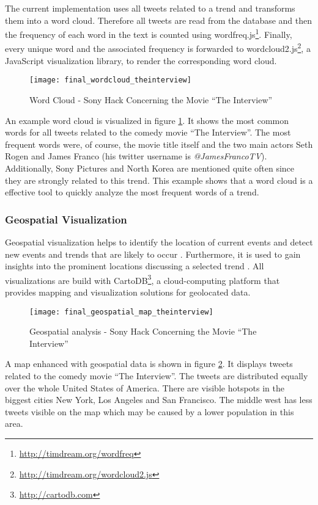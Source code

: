The current implementation uses all tweets related to a trend and transforms them into a word cloud. Therefore all tweets are read from the database and then the frequency of each word in the text is counted using wordfreq.js\footnote{\url{http://timdream.org/wordfreq} \accessednote}. Finally, every unique word and the associated frequency is forwarded to wordcloud2.js\footnote{\url{http://timdream.org/wordcloud2.js} \accessednote}, a JavaScript visualization library, to render the corresponding word cloud.

\begin{figure}[H]
  \centering
        \texttt{[image: final\_wordcloud\_theinterview]}
  \caption[Word Cloud - Sony Hack Concerning the Movie \enquote{The Interview}]{Word Cloud - Sony Hack Concerning the Movie \enquote{The Interview}}
  \label{fig:word-cloud-interview}
  \vspace{-1.3em}
\end{figure}

An example word cloud is visualized in figure \ref{fig:word-cloud-interview}. It shows the most common words for all tweets related to the comedy movie \enquote{The Interview}. The most frequent words were, of course, the movie title itself and the two main actors Seth Rogen and James Franco (his twitter username is \textit{@JamesFrancoTV}). Additionally, Sony Pictures and North Korea are mentioned quite often since they are strongly related to this trend. This example shows that a word cloud is a effective tool to quickly analyze the most frequent words of a trend.

\subsubsection{Geospatial Visualization}
\label{subsubsection:vis-geospatial}
Geospatial visualization helps to identify the location of current events and detect new events and trends that are likely to occur \cite{TwitterDataAnalytics2013}. Furthermore, it is used to gain insights into the prominent locations discussing a selected trend \cite[64-66]{TwitterDataAnalytics2013}. All visualizations are build with CartoDB\footnote{\url{http://cartodb.com} \accessednote}, a cloud-computing platform that provides mapping and visualization solutions for geolocated data.

\begin{figure}[H]
  \centering
        \texttt{[image: final\_geospatial\_map\_theinterview]}
  \caption[Geospatial analysis - Sony Hack Concerning the Movie \enquote{The Interview}]{Geospatial analysis - Sony Hack Concerning the Movie \enquote{The Interview}}
  \label{fig:map-interview}
  \vspace{-1.3em}
\end{figure}

A map enhanced with geospatial data is shown in figure \ref{fig:map-interview}. It displays tweets related to the comedy movie \enquote{The Interview}. The tweets are distributed equally over the whole United States of America. There are visible hotspots in the biggest cities New York, Los Angeles and San Francisco. The middle west has less tweets visible on the map which may be caused by a lower population in this area.